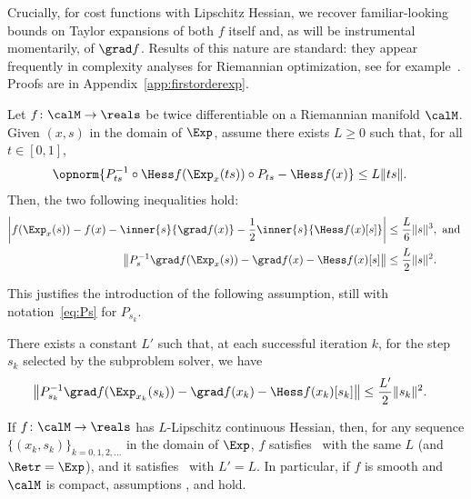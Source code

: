 Crucially, for cost functions with Lipschitz Hessian, we recover familiar-looking bounds on Taylor expansions of both $f$ itself and, as will be instrumental momentarily, of $\grad f$. Results of this nature are standard: they appear frequently in complexity analyses for Riemannian optimization, see for example~\citep{ferreira2002kantorovichnewton,bento2017iterationcomplexity,sun2019prgd}. Proofs are in Appendix~\ref{app:firstorderexp}.
\begin{proposition} \label{prop:LipschitzHessianBounds}
	Let $f \colon \calM \to \reals$ be twice differentiable on a Riemannian manifold $\calM$. Given $(x, s)$ in the domain of $\Exp$, assume there exists $L \geq 0$ such that, for all $t \in [0, 1]$,
	\begin{align*}
		\opnorm{P_{ts}^{-1} \circ \Hess f(\Exp_x(ts)) \circ P_{ts} - \Hess f(x)} & \leq L \|ts\|. %
	\end{align*}
	Then, the two following inequalities hold:
	\begin{align*}
		\left| f(\Exp_x(s)) - f(x) - \inner{s}{\grad f(x)} - \frac{1}{2} \inner{s}{\Hess f(x)[s]} \right| & \leq \frac{L}{6} \|s\|^3, \textrm{ and }\\
		\left\| P_{s}^{-1} \grad f(\Exp_x(s)) - \grad f(x) - \Hess f(x)[s] \right\| & \leq \frac{L}{2} \|s\|^2.
	\end{align*}
\end{proposition}
This justifies the introduction of the following assumption, still with notation~\eqref{eq:Ps} for $P_{s_k}$.
\begin{assumption} \label{assu:firstorderregularityvector}
	There exists a constant $L'$ such that, at each successful iteration $k$, for the step $s_k$ selected by the subproblem solver, we have
	\begin{align}
		\left\| P_{s_k}^{-1} \grad f(\Exp_{x_k}(s_k)) - \grad f(x_k) - \Hess f(x_k)[s_k] \right\| & \leq \frac{L'}{2} \|s_k\|^2. %
	\end{align}
\end{assumption}
\begin{corollary}
	If $f \colon \calM \to \reals$ has $L$-Lipschitz continuous Hessian, then, for any sequence $\{(x_k, s_k)\}_{k=0,1,2,\ldots}$ in the domain of $\Exp$, $f$ satisfies~ with the same $L$ (and $\Retr = \Exp$), and it satisfies~ with $L' = L$. In particular, if $f$ is smooth and $\calM$ is compact, assumptions ,  and  hold. %
\end{corollary}
